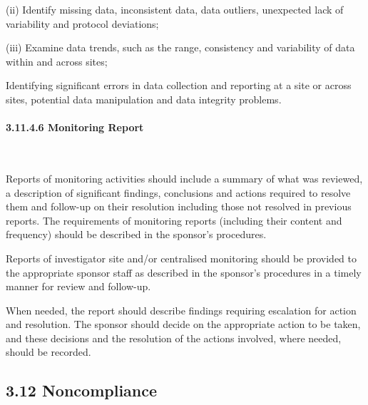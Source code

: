 \documentclass[11pt]{article}
\begin{document}
(ii) Identify missing data, inconsistent data, data outliers, unexpected lack of variability and protocol deviations;


(iii) Examine data trends, such as the range, consistency and variability of data within and across sites;


\begin{description}[leftmargin=2.5cm,style=sameline]

\item[(c)] Identifying significant errors in data collection and reporting at a site or across sites, potential data manipulation and data integrity problems.

\end{description}

\paragraph{3.11.4.6 Monitoring Report}\mbox{}\\

\begin{description}[leftmargin=2.5cm,style=sameline]

\item[(a)] Reports of monitoring activities should include a summary of what was reviewed, a description of significant findings, conclusions and actions required to resolve them and follow-up on their resolution including those not resolved in previous reports. The requirements of monitoring reports (including their content and frequency) should be described in the sponsor's procedures.

\item[(b)] Reports of investigator site and/or centralised monitoring should be provided to the appropriate sponsor staff as described in the sponsor's procedures in a timely manner for review and follow-up.

\item[(c)] When needed, the report should describe findings requiring escalation for action and resolution. The sponsor should decide on the appropriate action to be taken, and these decisions and the resolution of the actions involved, where needed, should be recorded.

\end{description}

\subsection{3.12 Noncompliance}
\end{document}
